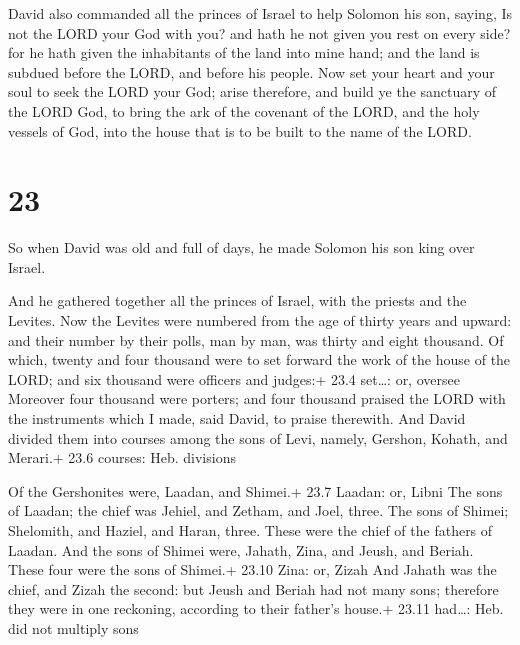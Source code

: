  David also commanded all the princes of Israel to help
Solomon his son, saying,  Is not the LORD your God with
you? and hath he not given you rest on every side? for he hath given the
inhabitants of the land into mine hand; and the land is subdued before
the LORD, and before his people.  Now set your heart and
your soul to seek the LORD your God; arise therefore, and build ye the
sanctuary of the LORD God, to bring the ark of the covenant of the LORD,
and the holy vessels of God, into the house that is to be built to the
name of the LORD.

\hypertarget{section-22}{%
\section{23}\label{section-22}}

 So when David was old and full of days, he made Solomon his
son king over Israel.

 And he gathered together all the princes of Israel, with
the priests and the Levites.  Now the Levites were numbered
from the age of thirty years and upward: and their number by their
polls, man by man, was thirty and eight thousand.  Of which,
twenty and four thousand were to set forward the work of the house of
the LORD; and six thousand were officers and judges:+ 23.4 set\ldots:
or, oversee  Moreover four thousand were porters; and four
thousand praised the LORD with the instruments which I made, said David,
to praise therewith.  And David divided them into courses
among the sons of Levi, namely, Gershon, Kohath, and Merari.+ 23.6
courses: Heb. divisions

 Of the Gershonites were, Laadan, and Shimei.+ 23.7
Laadan: or, Libni  The sons of Laadan; the chief was Jehiel,
and Zetham, and Joel, three.  The sons of Shimei; Shelomith,
and Haziel, and Haran, three. These were the chief of the fathers of
Laadan.  And the sons of Shimei were, Jahath, Zina, and
Jeush, and Beriah. These four were the sons of Shimei.+ 23.10 Zina: or,
Zizah  And Jahath was the chief, and Zizah the second: but
Jeush and Beriah had not many sons; therefore they were in one
reckoning, according to their father's house.+ 23.11 had\ldots: Heb. did
not multiply sons

